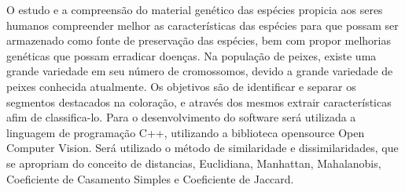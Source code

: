 O estudo e a compreensão do material genético das espécies propicia aos seres humanos compreender melhor as características das espécies para que possam ser armazenado como fonte de preservação das espécies, bem com propor melhorias genéticas que possam erradicar doenças. Na população de peixes, existe uma grande variedade em seu número de cromossomos, devido a grande variedade de peixes conhecida atualmente. Os objetivos são de identificar e separar os segmentos destacados na coloração, e através dos mesmos extrair características afim de classifica-lo. Para o desenvolvimento do software será utilizada a linguagem de programação C++, utilizando a biblioteca opensource Open Computer Vision. Será utilizado o método de similaridade e dissimilaridades, que se apropriam do conceito de distancias, Euclidiana, Manhattan, Mahalanobis, Coeficiente de Casamento Simples e Coeficiente de Jaccard.
